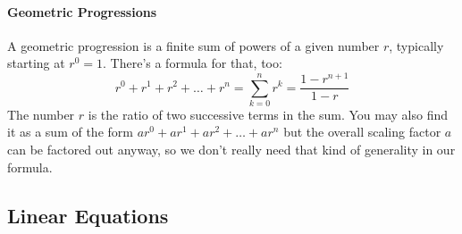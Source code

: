 





\paragraph{Geometric Progressions}
A geometric progression is a finite sum of powers of a given number $r$, typically starting at $r^0 = 1$. There's a formula for that, too:
\begin{equation}
 r^0 + r^1 + r^2 + \ldots + r^n = \sum_{k=0}^{n} r^k = \frac{1-r^{n+1}}{1 - r}
\end{equation}
The number $r$ is the ratio of two successive terms in the sum. You may also find it as a sum of the form $a r^0 + a r^1 + a r^2 + \ldots + a r^n$ but the overall scaling factor $a$ can be factored out anyway, so we don't really need that kind of generality in our formula.



\subsection{Linear Equations}


